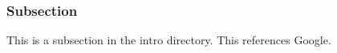 \subsubsection{Subsection}
This is a subsection in the intro directory. This references Google\cite{google}.